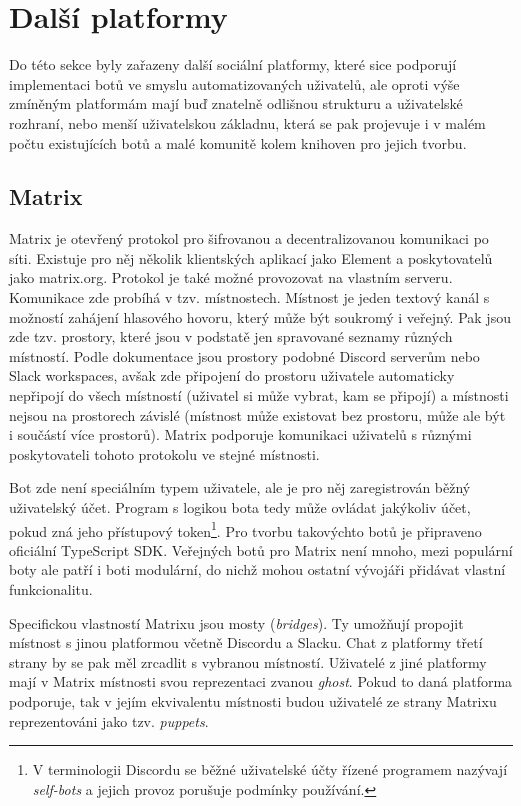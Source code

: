 \documentclass[FM]{tulthesis}
\begin{document}
	\section{Další platformy}
	
	Do této sekce byly zařazeny další sociální platformy, které sice podporují implementaci botů ve smyslu automatizovaných uživatelů, ale oproti výše zmíněným platformám mají buď znatelně odlišnou strukturu a uživatelské rozhraní, nebo menší uživatelskou základnu, která se pak projevuje i v malém počtu existujících botů a malé komunitě kolem knihoven pro jejich tvorbu.
	
	\subsection{Matrix}
	
	Matrix je otevřený protokol pro šifrovanou a decentralizovanou komunikaci po síti. Existuje pro něj několik klientských aplikací jako Element a poskytovatelů jako matrix.org. Protokol je také možné provozovat na vlastním serveru. Komunikace zde probíhá v tzv. místnostech. Místnost je jeden textový kanál s možností zahájení hlasového hovoru, který může být soukromý i veřejný. Pak jsou zde tzv. prostory, které jsou v podstatě jen spravované seznamy různých místností. Podle dokumentace jsou prostory podobné Discord serverům nebo Slack workspaces, avšak zde připojení do prostoru uživatele automaticky nepřipojí do všech místností (uživatel si může vybrat, kam se připojí) a místnosti nejsou na prostorech závislé (místnost může existovat bez prostoru, může ale být i součástí více prostorů). Matrix podporuje komunikaci uživatelů s různými poskytovateli tohoto protokolu ve stejné místnosti.
	
	Bot zde není speciálním typem uživatele, ale je pro něj zaregistrován běžný uživatelský účet. Program s logikou bota tedy může ovládat jakýkoliv účet, pokud zná jeho přístupový token\footnote{V terminologii Discordu se běžné uživatelské účty řízené programem nazývají \textit{self-bots} a jejich provoz porušuje podmínky používání.}. Pro tvorbu takovýchto botů je připraveno oficiální \mbox{TypeScript} SDK. Veřejných botů pro Matrix není mnoho, mezi populární boty ale patří i boti modulární, do nichž mohou ostatní vývojáři přidávat vlastní funkcionalitu.
	
	Specifickou vlastností Matrixu jsou mosty (\textit{bridges}). Ty umožňují propojit místnost s jinou platformou včetně  Discordu a Slacku. Chat z platformy třetí strany by se pak měl zrcadlit s vybranou místností. Uživatelé z jiné platformy mají v Matrix místnosti svou reprezentaci zvanou \textit{ghost}. Pokud to daná platforma podporuje, tak v jejím ekvivalentu místnosti budou uživatelé ze strany Matrixu reprezentováni jako tzv. \textit{puppets}. \cite{doc_Matrix}
	
\end{document}
